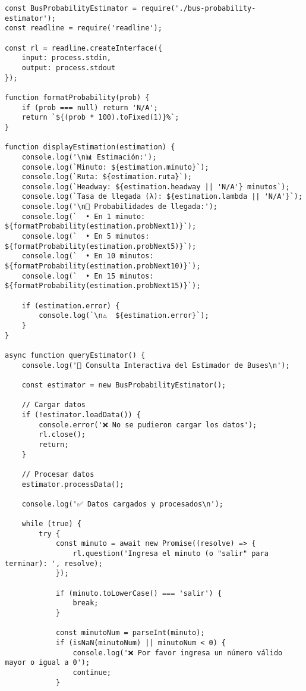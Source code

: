 \documentclass[12pt,a4paper]{article}
\begin{document}
\begin{lstlisting}[caption=query-estimator.js completo]
const BusProbabilityEstimator = require('./bus-probability-estimator');
const readline = require('readline');

const rl = readline.createInterface({
    input: process.stdin,
    output: process.stdout
});

function formatProbability(prob) {
    if (prob === null) return 'N/A';
    return `${(prob * 100).toFixed(1)}%`;
}

function displayEstimation(estimation) {
    console.log('\n📊 Estimación:');
    console.log(`Minuto: ${estimation.minuto}`);
    console.log(`Ruta: ${estimation.ruta}`);
    console.log(`Headway: ${estimation.headway || 'N/A'} minutos`);
    console.log(`Tasa de llegada (λ): ${estimation.lambda || 'N/A'}`);
    console.log('\n🚌 Probabilidades de llegada:');
    console.log(`  • En 1 minuto:  ${formatProbability(estimation.probNext1)}`);
    console.log(`  • En 5 minutos: ${formatProbability(estimation.probNext5)}`);
    console.log(`  • En 10 minutos: ${formatProbability(estimation.probNext10)}`);
    console.log(`  • En 15 minutos: ${formatProbability(estimation.probNext15)}`);
    
    if (estimation.error) {
        console.log(`\n⚠️  ${estimation.error}`);
    }
}

async function queryEstimator() {
    console.log('🚌 Consulta Interactiva del Estimador de Buses\n');
    
    const estimator = new BusProbabilityEstimator();
    
    // Cargar datos
    if (!estimator.loadData()) {
        console.error('❌ No se pudieron cargar los datos');
        rl.close();
        return;
    }
    
    // Procesar datos
    estimator.processData();
    
    console.log('✅ Datos cargados y procesados\n');
    
    while (true) {
        try {
            const minuto = await new Promise((resolve) => {
                rl.question('Ingresa el minuto (o "salir" para terminar): ', resolve);
            });
            
            if (minuto.toLowerCase() === 'salir') {
                break;
            }
            
            const minutoNum = parseInt(minuto);
            if (isNaN(minutoNum) || minutoNum < 0) {
                console.log('❌ Por favor ingresa un número válido mayor o igual a 0');
                continue;
            }
            

\end{lstlisting}
\end{document}
